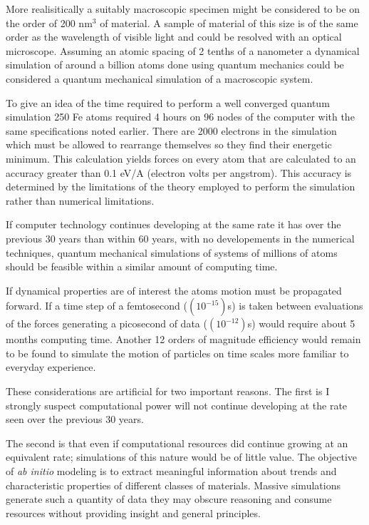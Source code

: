 More realisitically a suitably macroscopic specimen might be considered to be on the 
order of 200 nm$^{3}$ of material. A sample of material of this size is of the 
same order as the wavelength of visible light and could be
resolved with an optical microscope. Assuming an atomic spacing of 2 tenths 
of a nanometer a dynamical simulation of around a billion atoms 
done using quantum mechanics could be considered a quantum mechanical 
simulation of a macroscopic system. 

To give an idea of the time required to perform a well converged quantum simulation 
250 Fe atoms required 4 hours on 96 nodes of the computer with the same 
specifications noted earlier. There are 2000 electrons in the 
simulation which must be allowed
to rearrange themselves so they find their energetic minimum. 
This calculation yields forces on every 
atom that are calculated to an accuracy greater 
than 0.1 eV/A (electron volts per angstrom).
This accuracy is determined by the limitations 
of the theory employed to perform the simulation
rather than numerical limitations.

If computer technology continues developing at the same rate it has
over the previous 30 years than within 60 years, with 
no developements in the numerical techniques, 
quantum mechanical simulations of systems of 
millions of atoms should be feasible within a 
similar amount of computing time. 

If dynamical properties are of interest the atoms motion must be propagated forward. 
If a time step of a femtosecond ($(10^{-15})$s) is taken between evaluations of the 
forces generating a picosecond of data ($(10^{-12})$s) would require about 5 months 
computing time. Another 12 orders of magnitude efficiency would remain to be found to 
simulate the motion of particles on time scales more familiar to
everyday experience.

These considerations are artificial for two important reasons. The first
is I strongly suspect computational power will not continue developing at the rate
seen over the previous 30 years. 

The second is that even if computational resources did continue growing 
at an equivalent rate; simulations of this nature would be of little value.
The objective of {\it ab initio} modeling is to extract meaningful information
about trends and characteristic properties of different classes of materials. 
Massive simulations generate such a quantity of data they may obscure 
reasoning and consume resources without providing insight and general principles.

